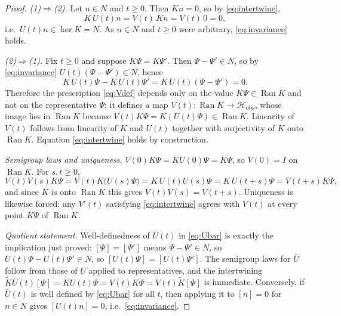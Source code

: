 \documentclass[11pt,reqno]{amsart}
\numberwithin{equation}{section}
\theoremstyle{plain}
\theoremstyle{definition}
\theoremstyle{remark}
\newcommand{\Hobs}{\mathcal{H}_{\mathrm{obs}}}
\newcommand{\Ran}{\operatorname{Ran}}
\newcommand{\Kt}{\widetilde{K}}
\begin{document}
\begin{proof}
\emph{(1)$\Rightarrow$(2).} Let $n\in N$ and $t\ge0$. Then $Kn=0$, so by
\eqref{eq:intertwine},
\[
K\,U(t)n=V(t)\,Kn=V(t)\,0=0,
\]
i.e.\ $U(t)n\in\ker K=N$. As $n\in N$ and $t\ge0$ were arbitrary, \eqref{eq:invariance}
holds.

\emph{(2)$\Rightarrow$(1).} Fix $t\ge0$ and suppose $K\Psi=K\Psi'$. Then
$\Psi-\Psi'\in N$, so by \eqref{eq:invariance} $U(t)(\Psi-\Psi')\in N$, hence
\[
K\,U(t)\Psi-K\,U(t)\Psi'=K\,U(t)(\Psi-\Psi')=0 .
\]
Therefore the prescription \eqref{eq:Vdef} depends only on the value $K\Psi\in\Ran K$ and
not on the representative $\Psi$; it defines a map $V(t):\Ran K\to\Hobs$, whose image lies
in $\Ran K$ because $V(t)K\Psi=K(U(t)\Psi)\in\Ran K$. Linearity of $V(t)$ follows from
linearity of $K$ and $U(t)$ together with surjectivity of $K$ onto $\Ran K$. Equation
\eqref{eq:intertwine} holds by construction.

\emph{Semigroup laws and uniqueness.} $V(0)K\Psi=KU(0)\Psi=K\Psi$, so $V(0)=I$ on $\Ran K$.
For $s,t\ge0$,
\[
V(t)V(s)K\Psi=V(t)K\bigl(U(s)\Psi\bigr)=K\,U(t)U(s)\Psi=K\,U(t+s)\Psi=V(t+s)K\Psi ,
\]
and since $K$ is onto $\Ran K$ this gives $V(t)V(s)=V(t+s)$. Uniqueness is likewise forced:
any $V'(t)$ satisfying \eqref{eq:intertwine} agrees with $V(t)$ at every point $K\Psi$ of
$\Ran K$.

\emph{Quotient statement.} Well-definedness of $\bar U(t)$ in \eqref{eq:Ubar} is exactly the
implication just proved: $[\Psi]=[\Psi']$ means $\Psi-\Psi'\in N$, so
$U(t)\Psi-U(t)\Psi'\in N$, so $[U(t)\Psi]=[U(t)\Psi']$. The semigroup laws for $\bar U$
follow from those of $U$ applied to representatives, and the intertwining
$\Kt\bar U(t)[\Psi]=K U(t)\Psi=V(t)K\Psi=V(t)\Kt[\Psi]$ is immediate. Conversely, if
$\bar U(t)$ is well defined by \eqref{eq:Ubar} for all $t$, then applying it to $[n]=0$ for
$n\in N$ gives $[U(t)n]=0$, i.e.\ \eqref{eq:invariance}.
\end{proof}
\end{document}
